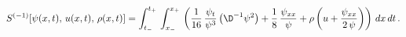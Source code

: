 \begin{equation}\label{eq:action -1 Lax}
S^{(-1)}[\psi(x,t),\, u(x,t),\, \rho(x,t)] = \int_{t_-}^{t_+} \,
\int_{x_-}^{x_+} \,\left(\frac{1}{16}\,\frac{\psi_t}{\psi^3}\left(\D^{-1}
\psi^2\right) + \frac{1}{8}\,\frac{\psi_{xx}}{\psi} + \rho \left(u +
\frac{\psi_{xx}}{2\,\psi}\right) \right)\,dx\,dt\,.
\end{equation}

